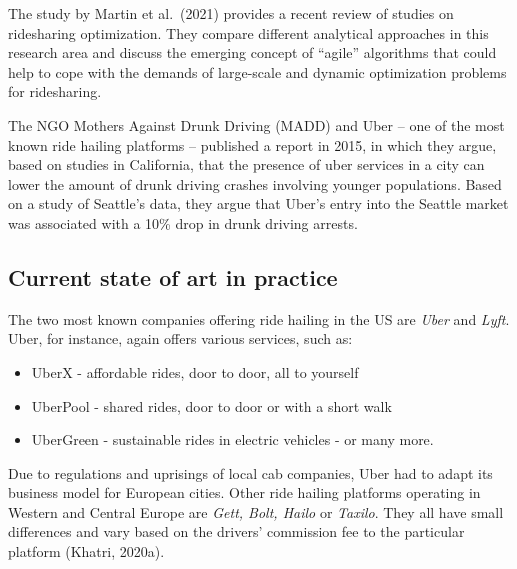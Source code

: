 \documentclass[
]{book}
\providecommand{\tightlist}{%
  \setlength{\itemsep}{0pt}\setlength{\parskip}{0pt}}
\begin{document}
The study by Martin et al.~(2021) provides a recent review of studies on ridesharing optimization. They compare different analytical approaches in this research area and discuss the emerging concept of ``agile'' algorithms that could help to cope with the demands of large-scale and dynamic optimization problems for ridesharing.

The NGO Mothers Against Drunk Driving (MADD) and Uber -- one of the most known ride hailing platforms -- published a report in 2015, in which they argue, based on studies in California, that the presence of uber services in a city can lower the amount of drunk driving crashes involving younger populations. Based on a study of Seattle's data, they argue that Uber's entry into the Seattle market was associated with a 10\% drop in drunk driving arrests.

\hypertarget{current-state-of-art-in-practice-45}{%
\subsection*{Current state of art in practice}\label{current-state-of-art-in-practice-45}}

The two most known companies offering ride hailing in the US are \emph{Uber} and \emph{Lyft}. Uber, for instance, again offers various services, such as:

\begin{itemize}
\tightlist
\item
  UberX - affordable rides, door to door, all to yourself
\item
  UberPool - shared rides, door to door or with a short walk
\item
  UberGreen - sustainable rides in electric vehicles - or many more.
\end{itemize}

Due to regulations and uprisings of local cab companies, Uber had to adapt its business model for European cities. Other ride hailing platforms operating in Western and Central Europe are \emph{Gett, Bolt, Hailo} or \emph{Taxilo}. They all have small differences and vary based on the drivers' commission fee to the particular platform (Khatri, 2020a).
\end{document}
